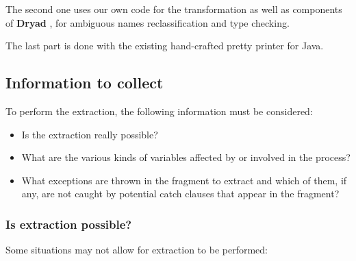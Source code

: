 \documentclass[a4paper,10pt]{article}
\begin{document}
The second one uses our own code for the transformation as well as components
of \textbf{Dryad} \cite{dryad}, for ambiguous names reclassification
and type checking.

The last part is done with the existing hand-crafted pretty printer for Java.

\subsection{Information to collect}
To perform the extraction, the following information must be considered:

\begin{itemize}

\item Is the extraction really possible?

\item What are the various kinds of variables affected by or involved in
the process?

\item What exceptions are thrown in the fragment to extract and
which of them, if any, are not caught by potential \textsf{catch} clauses
that appear in the fragment?

\end{itemize}

\subsubsection{Is extraction possible?}
Some situations may not allow for extraction to be performed:
\end{document}
